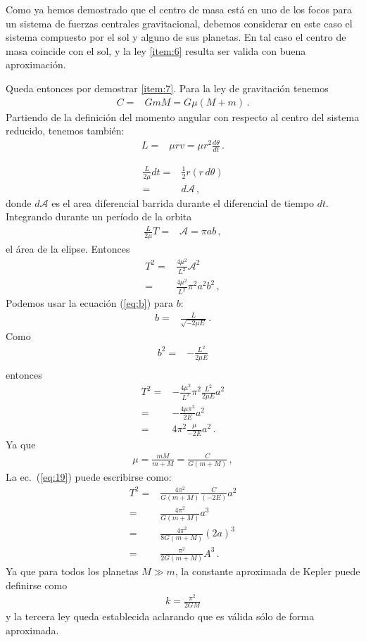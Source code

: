 Como ya hemos demostrado que el centro de masa está en uno de los focos para un sistema de fuerzas centrales gravitacional, debemos considerar en este caso el sistema compuesto por el sol y alguno de sus planetas. En tal caso el centro de masa coincide con el sol, y la ley \ref{item:6} resulta ser valida con buena aproximación. 

Queda entonces por demostrar \ref{item:7}. Para la ley de gravitación tenemos
\begin{align}
    C=&GmM=G\mu(M+m)\,.
\end{align}
Partiendo de la definición del momento angular con respecto al centro del sistema reducido, tenemos también:
\begin{align}
  L=&\mu r v=\mu r^2 \frac{d\theta}{dt}\,.
\end{align}

\begin{align}
  \frac{L}{2\mu}dt =&\frac{1}{2}r (r\,d\theta)\nonumber\\
=&d\mathcal{A}\,,
\end{align}
donde $d\mathcal{A}$ es el area diferencial barrida durante el diferencial de tiempo $dt$. Integrando durante un período de la orbita
\begin{align}
  \frac{L}{2\mu} T=&\mathcal{A}=\pi a b\,,
\end{align}
el área de la elipse. Entonces
\begin{align}
  T^2=&\frac{4\mu^2}{L^2}\mathcal{A}^2\nonumber\\
  =&\frac{4\mu^2}{L^2}\pi^2 a^2 b^2\,,
\end{align}
Podemos usar la  ecuación (\ref{eq:b}) para $b$:
\begin{align*}
  b=&\frac{L}{\sqrt{-2\mu E}}\,.
\end{align*}
Como
\begin{align}
  b^2=&-\frac{L^2}{2\mu E}\nonumber\\
\end{align}
entonces
\begin{align}
  \label{eq:19}
T^2=&-\frac{4\mu^2}{L^2}\pi^2\frac{L^2}{2\mu E} a^2 \nonumber\\
=&-\frac{4\mu\pi^2}{2E} a^2 \nonumber\\
=&4\pi^2\frac{\mu}{-2E} a^2 \,.
\end{align}
Ya que
\begin{align}
  \mu=\frac{mM}{m+M}=\frac{C}{G(m+M)}\,,
\end{align}
La ec.~(\ref{eq:19}) puede escribirse como:
\begin{align}
  T^2=&\frac{4\pi^2}{G(m+M)}\frac{C}{(-2E)} a^2 \nonumber\\
=&\frac{4\pi^2}{G(m+M)}a^3 \nonumber\\
=&\frac{4\pi^2}{8G(m+M)}(2a)^3 \nonumber\\
=&\frac{\pi^2}{2G(m+M)}A^3 \,.
\end{align}
Ya que para todos los planetas $M\gg m$, la constante aproximada de Kepler puede definirse como
\begin{align}
  k=\frac{\pi^2}{2GM}
\end{align}
y la tercera ley queda establecida aclarando que es válida sólo de forma aproximada.



